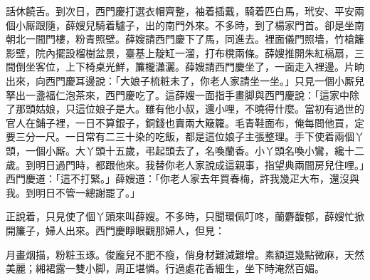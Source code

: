 話休饒舌。到次日，西門慶打選衣帽齊整，袖着插戴，騎着匹白馬，玳安、平安兩個小厮跟隨，薛嫂兒騎着驢子，出的南門外來。不多時，到了楊家門首。卻是坐南朝北一間門樓，粉青照壁。薛嫂請西門慶下了馬，同進去。裡面儀門照墻，竹槍籬影壁，院內擺設榴樹盆景，臺基上靛缸一溜，打布櫈兩條。{}薛嫂推開朱紅槅扇，三間倒坐客位，上下椅桌光鮮，簾櫳瀟灑。薛嫂請西門慶坐了，一面走入裡邊。片晌出來，向西門慶耳邊說：「大娘子梳粧未了，你老人家請坐一坐。」只見一個小厮兒拏出一盞福仁泡茶來，西門慶吃了。這薛嫂一面指手畫脚與西門慶說：「這家中除了那頭姑娘，只這位娘子是大。雖有他小叔，還小哩，不曉得什麼。當初有過世的官人在鋪子裡，一日不算銀子，銅錢也賣兩大簸籮。毛青鞋面布，{}俺每問他買，定要三分一尺。一日常有二三十染的吃飯，都是這位娘子主張整理。{}手下使着兩個丫頭，一個小厮。大丫頭十五歲，弔起頭去了，名喚蘭香。小丫頭名喚小鸞，纔十二歲。到明日過門時，都跟他來。我替你老人家說成這親事，指望典兩間房兒住哩。」西門慶道：「這不打緊。」薛嫂道：「你老人家去年買春梅，{}許我幾疋大布，還沒與我。到明日不管一總謝罷了。」

正說着，只見使了個丫頭來叫薛嫂。不多時，只聞環佩叮咚，蘭麝馥郁，薛嫂忙掀開簾子，婦人出來。西門慶睜眼觀那婦人，但見：

\begin{myquote} 
月畫烟描，粉粧玉琢。俊龐兒不肥不瘦，俏身材難減難增。素額逗幾點微麻，天然美麗；緗裙露一雙小脚，周正堪憐。行過處花香細生，坐下時淹然百媚。
\end{myquote} 

